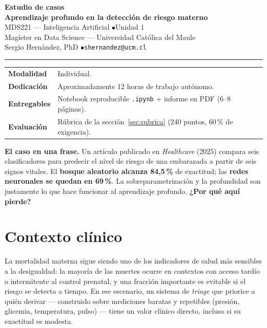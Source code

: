 \documentclass[11pt, a4paper]{article}
\begin{document}
\begin{center}
{\LARGE\bfseries\color{UCMNavy} Estudio de casos}\\[4pt]
{\Large\bfseries Aprendizaje profundo en la detección de riesgo materno}\\[10pt]
{\normalsize MDS221 --- Inteligencia Artificial \quad$\bullet$\quad Unidad 1}\\[2pt]
{\normalsize Mag\'ister en Data Science --- Universidad Cat\'olica del Maule}\\[2pt]
{\small Sergio Hern\'andez, PhD \quad$\bullet$\quad \texttt{shernandez@ucm.cl}}
\end{center}
\vspace{0.4em}
\hrule
\vspace{1em}

\noindent
\begin{tabularx}{\textwidth}{@{}p{3.2cm}X@{}}
\textbf{Modalidad} & Individual.\\
\textbf{Dedicaci\'on} & Aproximadamente 12 horas de trabajo aut\'onomo.\\
\textbf{Entregables} & Notebook reproducible \texttt{.ipynb} + informe en PDF (6--8 p\'aginas).\\
\textbf{Evaluaci\'on} & R\'ubrica de la secci\'on~\ref{sec:rubrica} (240 puntos, 60\,\% de exigencia).\\
\end{tabularx}

\vspace{0.8em}
\begin{pregunta}
\textbf{El caso en una frase.} Un art\'iculo publicado en \emph{Healthcare} (2025) compara seis clasificadores para predecir el nivel de riesgo de una embarazada a partir de seis signos vitales. El \textbf{bosque aleatorio alcanza 84{,}5\,\%} de exactitud; las \textbf{redes neuronales se quedan en 69\,\%}. La sobreparametrizaci\'on y la profundidad son justamente lo que hace funcionar al aprendizaje profundo. \textbf{¿Por qu\'e aqu\'i pierde?}
\end{pregunta}

\section{Contexto clínico}

La mortalidad materna sigue siendo uno de los indicadores de salud m\'as sensibles a la desigualdad: la mayor\'ia de las muertes ocurre en contextos con acceso tard\'io o intermitente al control prenatal, y una fracci\'on importante es evitable si el riesgo se detecta a tiempo. En ese escenario, un sistema de \emph{triage} que priorice a qui\'en derivar --- construido sobre mediciones baratas y repetibles (presi\'on, glicemia, temperatura, pulso) --- tiene un valor cl\'inico directo, incluso si su exactitud es modesta.
\end{document}
